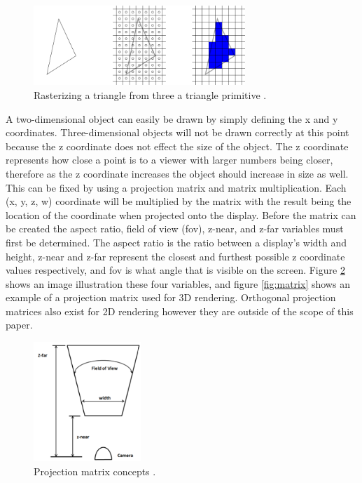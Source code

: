 \documentclass{article}
\begin{document}
\begin{figure}[h]
	\centering
	\includegraphics[height=3cm]{triangle-rendering}
	\caption{Rasterizing a triangle from three a triangle primitive \cite{mckesson2018}.}
	\label{fig:triangle-rendering}
\end{figure}

A two-dimensional object can easily be drawn by simply defining the x and y coordinates. Three-dimensional objects will not be drawn correctly at this point because the z coordinate does not effect the size of the object. The z coordinate represents how close a point is to a viewer with larger numbers being closer, therefore as the z coordinate increases the object should increase in size as well. This can be fixed by using a projection matrix and matrix multiplication. Each (x, y, z, w) coordinate will be multiplied by the matrix with the result being the location of the coordinate when projected onto the display. Before the matrix can be created the aspect ratio, field of view (fov), z-near, and z-far variables must first be determined. The aspect ratio is the ratio between a display's width and height, z-near and z-far represent the closest and furthest possible z coordinate values respectively, and fov is what angle that is visible on the screen. Figure \ref{fig:projection} shows an image illustration these four variables, and figure \ref{fig:matrix} shows an example of a projection matrix used for 3D rendering. Orthogonal projection matrices also exist for 2D rendering however they are outside of the scope of this paper.

\begin{figure}[h]
	\centering
	\includegraphics[height=4.5cm]{projection-matrix}
	\caption{Projection matrix concepts \cite{hernandez2019}.}
	\label{fig:projection}
\end{figure}
\end{document}

